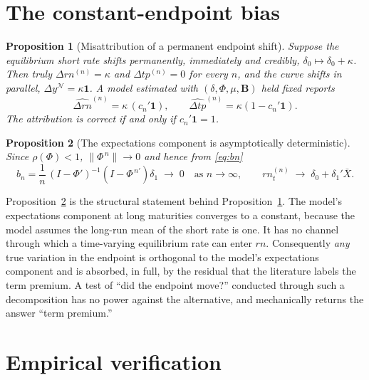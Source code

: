 \documentclass[11pt]{article}
\newtheorem{proposition}{Proposition}
\theoremstyle{remark}\newtheorem{remark}{Remark}
\begin{document}
\section{The constant-endpoint bias}

\begin{proposition}[Misattribution of a permanent endpoint shift]\label{prop:endpoint}
Suppose the equilibrium short rate shifts permanently, immediately and credibly, $\delta_0\mapsto\delta_0+\kappa$. Then truly $\Delta rn^{(n)}=\kappa$ and $\Delta tp^{(n)}=0$ for every $n$, and the curve shifts in parallel, $\Delta y^{\mathcal N}=\kappa\boldsymbol{1}$. A model estimated with $(\delta,\Phi,\mu,\mathbf{B})$ held fixed reports
\begin{equation}
\widehat{\Delta rn}^{(n)}=\kappa\,(c_n'\boldsymbol{1}),
\qquad
\widehat{\Delta tp}^{(n)}=\kappa\left(1-c_n'\boldsymbol{1}\right).
\end{equation}
The attribution is correct if and only if $c_n'\boldsymbol{1}=1$.
\end{proposition}

\begin{proposition}[The expectations component is asymptotically deterministic]\label{prop:limit}
Since $\rho(\Phi)<1$, $\|\Phi^{\,n}\|\to0$ and hence from \eqref{eq:bn}
\begin{equation}
b_n=\frac1n\,(I-\Phi')^{-1}\!\left(I-\Phi^{\,n\prime}\right)\delta_1\;\longrightarrow\;0
\quad\text{as }n\to\infty,
\qquad
rn_t^{(n)}\;\longrightarrow\;\delta_0+\delta_1'\bar X .
\end{equation}
\end{proposition}

\noindent Proposition~\ref{prop:limit} is the structural statement behind Proposition~\ref{prop:endpoint}. The model's expectations component at long maturities converges to a constant, because the model assumes the long-run mean of the short rate is one. It has no channel through which a time-varying equilibrium rate can enter $rn$. Consequently \emph{any} true variation in the endpoint is orthogonal to the model's expectations component and is absorbed, in full, by the residual that the literature labels the term premium. A test of ``did the endpoint move?'' conducted through such a decomposition has no power against the alternative, and mechanically returns the answer ``term premium.''

\section{Empirical verification}
\end{document}
